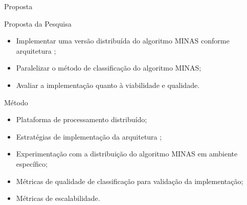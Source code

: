 \documentclass[aspectratio=1610,10pt]{beamer}
\newcommand{\minas}{MINAS\xspace}
\begin{document}
\begin{frame}[fragile]{Proposta}
  \begin{block}{Proposta da Pesquisa}
    \begin{itemize}
      \item Implementar uma versão distribuída do algoritmo \minas conforme arquitetura \arch;
      \item Paralelizar o método de classificação do algoritmo \minas;
      \item Avaliar a implementação quanto à viabilidade e qualidade.
    \end{itemize}
  \end{block}

  \begin{alertblock}{Método}
    \begin{itemize}%
      \item Plataforma de processamento distribuído;
      \item Estratégias de implementação da arquitetura \arch;
      \item Experimentação com a distribuição do algoritmo \minas em ambiente específico;
      \item Métricas de qualidade de classificação para validação da implementação;
      \item Métricas de escalabilidade.
    \end{itemize}
  \end{alertblock}
\end{frame}
\end{document}
